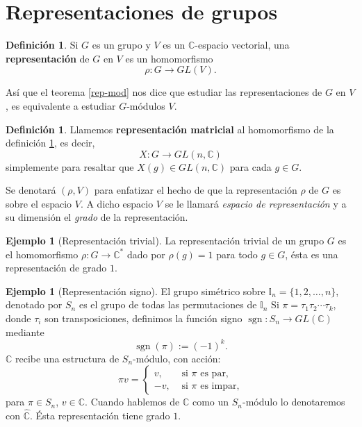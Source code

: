 \documentclass[12pt]{book}
\theoremstyle{definition}
\newtheorem{definition}[theorem]{Definición}
\newtheorem{example}[theorem]{Ejemplo}
\DeclareMathOperator{\sgn}{sgn}
\newcounter{in}
\newcounter{ini}
\begin{document}
\section{Representaciones de grupos}
\label{rep-grup}

\begin{definition}
  \label{representacion}
  Si $G$ es un grupo y $V$ es un $\mathbb{C}$-espacio vectorial, una
  \textbf{representación} de $G$ en $V$ es un homomorfismo 
     $$\rho:G\rightarrow GL(V).$$
\end{definition}
Así que el teorema \ref{rep-mod} nos dice que estudiar las representaciones de $G$
en $V$, es equivalente a estudiar $G$-módulos $V$.
\begin{definition}
  Llamemos \textbf{representación matricial} al homomorfismo
   de la definición \ref{representacion}, es decir, 
   $$X:G\rightarrow GL(n,\mathbb{C})$$
   simplemente para resaltar que $X(g)\in GL(n,\mathbb{C})$ para cada $g\in G$.
\end{definition}
Se denotará $(\rho,V)$ para enfatizar el hecho de que la
representación $\rho$ de $G$  es sobre el espacio $V$. A
dicho espacio $V$ se le llamará \emph{espacio de representación} y a
su dimensión el \emph{grado} de la representación. 

\begin{example}[Representación trivial]
  La representación trivial de un grupo $G$ es el homomorfismo
  $\rho:G\rightarrow \mathbb{C^{*}}$ dado por $\rho(g)=1$ para todo
  $g\in G$, ésta es una representación de grado $1$.
\end{example}

\begin{example}[Representación signo]
  El grupo simétrico sobre $\mathbb{I}_{n}=\{1,2,\ldots,n\}$, denotado
  por $S_{n}$ es el grupo de todas las permutaciones de $\mathbb{I}_{n}$ 
  Si $\pi=\tau_{1}\tau_{2}\cdots\tau_{k}$, donde $\tau_{i}$ son
  transposiciones, definimos la función signo
  $\sgn:S_{n} \rightarrow GL(\mathbb{C})$
  mediante $$\sgn(\pi):=(-1)^{k}.$$
  $\mathbb{C}$ recibe una estructura de $S_{n}$-módulo, con acción:
  \[
  \pi v=
  \begin{cases}
    v, & \text{ si } \pi \text{ es par,}\\
    -v, & \text{ si } \pi \text{ es impar,}
  \end{cases}
  \]
  para $\pi\in S_{n}$, $v\in \mathbb{C}$. Cuando hablemos de
  $\mathbb{C}$ como un $S_{n}$-módulo lo denotaremos con
  $\widehat{\mathbb{C}}$. Ésta representación tiene grado $1$.
\end{example}
\end{document}
